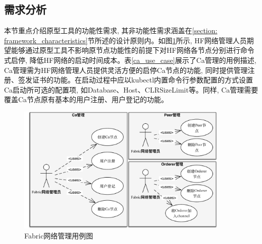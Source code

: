 \subsection{需求分析} \label{section: requirement}

本节重点介绍原型工具的功能性需求, 其非功能性需求涵盖在\ref{section: framework_characteristics}节所述的设计原则内。如图\ref{fabric_use_case}所示, HF网络管理人员期望能够通过原型工具不影响原节点功能性的前提下对HF网络各节点分别进行命令式启停, 降低HF网络的启动时间成本。表\ref{ca_use_case}展示了Ca管理的用例描述, Ca管理需为HF网络管理人员提供灵活方便的启停Ca节点的功能, 同时提供管理注册、签发证书的功能。在启动过程中应以kubectl内置命令行参数配置的方式设置Ca启动所可选的配置项, 如Database、Host、CLRSizeLimit等。同样, Ca管理需要覆盖Ca节点原有基本的用户注册、用户登记的功能。

\begin{figure}[!htbp] %
    \centering %
    \includegraphics[width=0.9\textwidth]{FIGs/chapter4/fabric_use_case.pdf} %
    \caption{Fabric网络管理用例图} %
    \label{fabric_use_case} %
\end{figure}%

